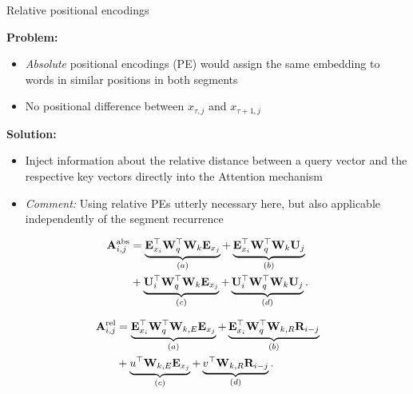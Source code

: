 
\begin{vbframe}{Relative positional encodings}

\vfill

\textbf{Problem:}

\begin{itemize}
	\item \textit{Absolute} positional encodings (PE) would assign the same embedding to words in similar positions in both segments
	\item No positional difference between $x_{\tau,j}$ and $x_{\tau+1,j}$
\end{itemize}

\textbf{Solution:}

\begin{itemize}
	\item Inject information about the relative distance between a query vector and the respective key vectors directly into the Attention mechanism
	\item \textit{Comment:} Using relative PEs utterly necessary here, but also applicable independently of the segment recurrence
\end{itemize}

\begin{align*}
	\rmA_{i,j}^\text{abs} 
	&= \underbrace{ \rmE_{x_i}^\top \rmW_q^\top \rmW_k \rmE_{x_j} }_{(a)}
	+ \underbrace{\rmE_{x_i}^\top \rmW_q^\top \rmW_k \rmU_{j}}_{(b)} \\
	&+ \underbrace{\rmU_{i}^\top \rmW_q^\top \rmW_k \rmE_{x_j}}_{(c)}
	+ \underbrace{\rmU_{i}^\top \rmW_q^\top \rmW_k \rmU_{j}}_{(d)}. \vspace{-0.5em}
\end{align*}

\begin{align*}
	{\mathbf{A}}_{i,j}^\text{rel}
	&= \underbrace{ {\mathbf{E}}_{x_i}^\top {\mathbf{W}}_q^\top {\mathbf{W}}_{k,E} {\mathbf{E}}_{x_j} }_{(a)}
	+ \underbrace{{\mathbf{E}}_{x_i}^\top {\mathbf{W}}_q^\top {\mathbf{W}}_{k,R} {\mathbf{R}}_{i-j} }_{(b)} \\
	&+ \underbrace{u^\top {\mathbf{W}}_{k,E} {\mathbf{E}}_{x_j}}_{(c)}
	+ \underbrace{v^\top {\mathbf{W}}_{k,R} {\mathbf{R}}_{i-j}}_{(d)}.
\end{align*}

\end{vbframe}


